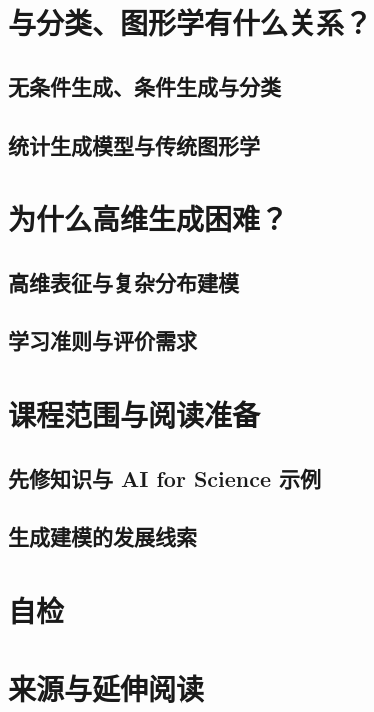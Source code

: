 \section{与分类、图形学有什么关系？}
\label{sec:intro-related-tasks}
\contentplaceholder

\subsection{无条件生成、条件生成与分类}
\label{subsec:intro-classification}
\contentplaceholder

\subsection{统计生成模型与传统图形学}
\label{subsec:intro-graphics}
\contentplaceholder

\section{为什么高维生成困难？}
\label{sec:intro-challenges}
\contentplaceholder

\subsection{高维表征与复杂分布建模}
\label{subsec:intro-representation-modeling}
\contentplaceholder

\subsection{学习准则与评价需求}
\label{subsec:intro-learning-evaluation}
\contentplaceholder

\section{课程范围与阅读准备}
\label{sec:intro-scope}
\contentplaceholder

\subsection{先修知识与 AI for Science 示例}
\label{subsec:intro-prerequisites}
\contentplaceholder

\subsection{生成建模的发展线索}
\label{subsec:intro-history}
\contentplaceholder

\section{自检}
\label{sec:intro-review}
\contentplaceholder

\section{来源与延伸阅读}
\label{sec:intro-reading}
\contentplaceholder
